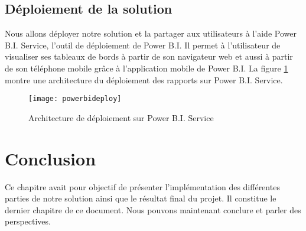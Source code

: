 \subsection{Déploiement de la solution}
Nous allons déployer notre solution et la partager aux utilisateurs à l'aide Power B.I. Service, l'outil de déploiement de Power B.I. Il permet à l'utilisateur de visualiser ses tableaux de bords à partir de son navigateur web et aussi à partir de son téléphone mobile grâce à l'application mobile de Power B.I. La figure \ref{fig:powerbideploy} montre une architecture du déploiement des rapports sur Power B.I. Service.

\begin{figure}[H]
    \centering
    \texttt{[image: powerbideploy]}
    \caption{Architecture de déploiement sur Power B.I. Service}
    \label{fig:powerbideploy}
\end{figure}

\section*{Conclusion}%
%
Ce chapitre avait pour objectif de présenter l’implémentation des différentes parties de notre solution ainsi que le résultat final du projet. Il constitue le dernier chapitre de ce document. Nous pouvons maintenant conclure et parler des perspectives.

